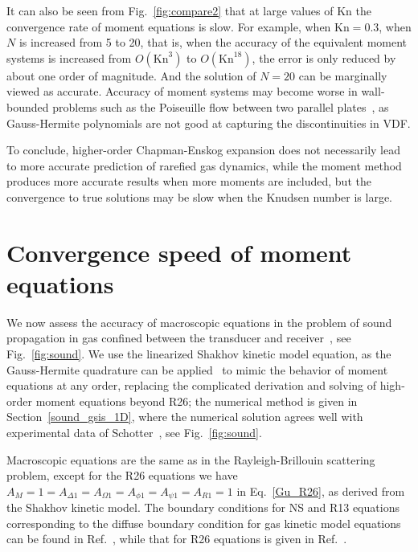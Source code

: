 It can also be seen from Fig.~\ref{fig:compare2} that at large values of $\text{Kn}$ the convergence rate of moment equations is slow. For example, when $\text{Kn}=0.3$, when $N$ is increased from 5 to 20, that is, when the accuracy of the equivalent moment systems is increased from $O(\text{Kn}^3)$ to $O(\text{Kn}^{18})$, the error is only reduced by about one order of magnitude. And the solution of $N=20$ can be marginally viewed as accurate. Accuracy of moment systems may become worse in wall-bounded problems such as the Poiseuille flow between two parallel plates~\cite{Su2007PRE}, as Gauss-Hermite polynomials are not good at capturing the discontinuities in VDF. 


To conclude, higher-order Chapman-Enskog expansion does not necessarily lead to more accurate prediction of rarefied gas dynamics, while the moment method produces more accurate results when more moments are included, but the convergence to true solutions may be slow when the Knudsen number is large. 










\section{Convergence speed of moment equations}\label{sound_section}

We now assess the accuracy of macroscopic equations in the problem of sound propagation in gas confined between the transducer and receiver~\cite{Wu2020AIA}, see Fig.~\ref{fig:sound}. We use the linearized Shakhov kinetic model equation, as the Gauss-Hermite quadrature can be applied~\citep{Shan2006JFM} to mimic the behavior of moment equations at any order, replacing the complicated derivation and solving of high-order moment equations beyond R26; the numerical method is given in Section~\ref{sound_gsis_1D}, where the numerical solution agrees well with  experimental data of Schotter~\cite{Schotter1974}, see Fig.~\ref{fig:sound}.


Macroscopic equations are the same as in the Rayleigh-Brillouin scattering problem, except for the R26 equations we have $A_M=1=A_{\Delta1}=A_{\Omega1}=A_{\phi1}=A_{\psi1}=A_{R1}=1$ in Eq.~\eqref{Gu_R26}, as derived from the Shakhov kinetic model. The boundary conditions for NS and R13 equations corresponding to the diffuse boundary condition for gas kinetic model equations can be found in Ref.~\cite{Struchtrup2011}, while that for R26 equations is given in Ref.~\cite{Gu2009JFM}.



